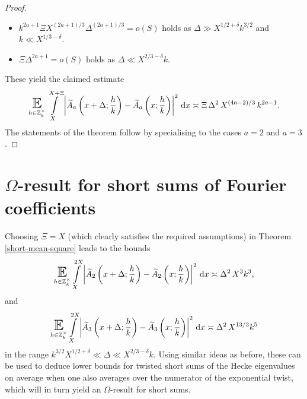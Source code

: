 \documentclass[a4paper,10pt,twoside]{amsart}
\theoremstyle{definition}
\numberwithin{equation}{section}
\newcommand\E{\mathbb{E}}
\renewcommand\:{\colon}
\begin{document}
\begin{proof}
\begin{itemize}
\item $k^{2a+1}\Xi X^{(2a+1)/3}\Delta^{(2a+1)/3}=o(S)$ holds as $\Delta\gg X^{1/2+\delta}k^{3/2}$ and $k\ll X^{1/3-\delta}$.

\item $\Xi \Delta^{2a+1}=o(S)$ holds as $\Delta\ll X^{2/3-\delta}k$.
\end{itemize} 
\noindent These yield the claimed estimate
\[ 
\mathop{\text{\LARGE$\E$}}_{h\in\mathbb Z_k^\times}\int\limits_X^{X+\Xi}\left|\widetilde A_a\left(x+\Delta;\frac hk\right)-\widetilde A_a\left(x;\frac hk\right)\right|^2\,\mathrm dx\asymp\Xi\,\Delta^2\,X^{(4a-2)/3}\,k^{2a-1}. \]
The statements of the theorem follow by specialising to the cases $a=2$ and $a=3$. 


\end{proof}     
  
\section{$\Omega$-result for short sums of Fourier coefficients}

\noindent Choosing $\Xi=X$ (which clearly satisfies the required assumptions) in Theorem \ref{short-mean-square} leads to the bounds
\begin{align}\label{A_2-meansquare-2}
\mathop{\text{\LARGE$\E$}}_{h\in\mathbb Z_k^\times}\int\limits_X^{2X}\left|\widetilde A_2\left(x+\Delta;\frac hk\right)-\widetilde A_2\left(x;\frac hk\right)\right|^2\,\mathrm dx\asymp\Delta^2\,X^3k^3,
\end{align}                  
and
\begin{align}\label{A_3-meansquare}
\mathop{\text{\LARGE$\E$}}_{h\in\mathbb Z_k^\times}\int\limits_X^{2X}\left|\widetilde A_3\left(x+\Delta;\frac hk\right)-\widetilde A_3\left(x;\frac hk\right)\right|^2\,\mathrm dx\asymp\Delta^2\,X^{13/3}k^5
\end{align}
in the range $k^{3/2}X^{1/2+\delta}\ll\Delta\ll X^{2/3-\delta}k$. Using similar ideas as before, these can be used to deduce lower bounds for twisted short sums of the Hecke eigenvalues on average when one also averages over the numerator of the exponential twist, which will in turn yield an $\Omega$-result for short sums. 
\end{document}
